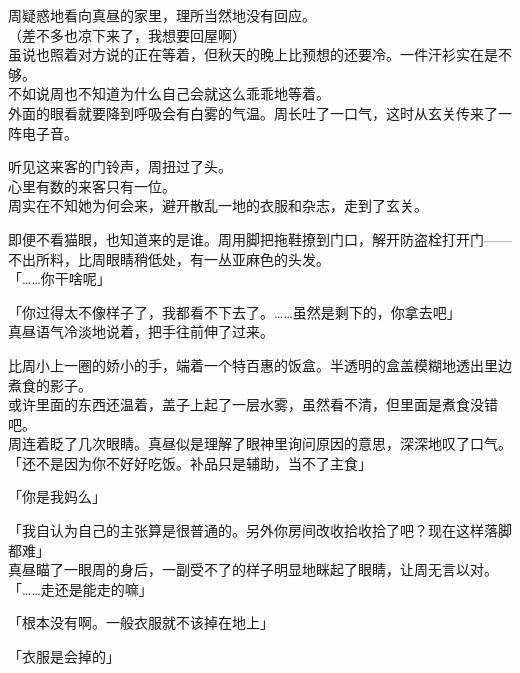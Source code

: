 周疑惑地看向真昼的家里，理所当然地没有回应。\\

（差不多也凉下来了，我想要回屋啊）\\

虽说也照着对方说的正在等着，但秋天的晚上比预想的还要冷。一件汗衫实在是不够。\\

不如说周也不知道为什么自己会就这么乖乖地等着。\\

外面的眼看就要降到呼吸会有白雾的气温。周长吐了一口气，这时从玄关传来了一阵电子音。

听见这来客的门铃声，周扭过了头。\\

心里有数的来客只有一位。\\

周实在不知她为何会来，避开散乱一地的衣服和杂志，走到了玄关。

即便不看猫眼，也知道来的是谁。周用脚把拖鞋撩到门口，解开防盗栓打开门——不出所料，比周眼睛稍低处，有一丛亚麻色的头发。\\

「……你干啥呢」

「你过得太不像样子了，我都看不下去了。……虽然是剩下的，你拿去吧」\\

真昼语气冷淡地说着，把手往前伸了过来。

比周小上一圈的娇小的手，端着一个特百惠的饭盒。半透明的盒盖模糊地透出里边煮食的影子。\\

或许里面的东西还温着，盖子上起了一层水雾，虽然看不清，但里面是煮食没错吧。\\

周连着眨了几次眼睛。真昼似是理解了眼神里询问原因的意思，深深地叹了口气。\\

「还不是因为你不好好吃饭。补品只是辅助，当不了主食」

「你是我妈么」

「我自认为自己的主张算是很普通的。另外你房间改收拾收拾了吧？现在这样落脚都难」\\

真昼瞄了一眼周的身后，一副受不了的样子明显地眯起了眼睛，让周无言以对。\\

「……走还是能走的嘛」

「根本没有啊。一般衣服就不该掉在地上」

「衣服是会掉的」

